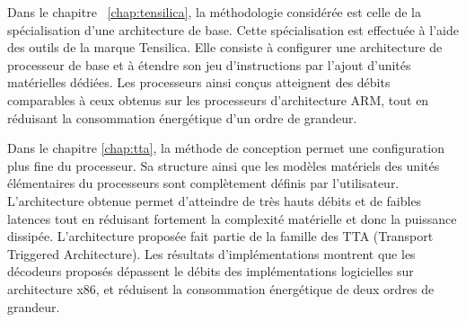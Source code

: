 Dans le chapitre ~\ref{chap:tensilica}, la méthodologie considérée est celle de la spécialisation d'une architecture de base. Cette spécialisation est effectuée à l'aide des outils de la marque Tensilica. Elle consiste à configurer une architecture de processeur de base et à étendre son jeu d'instructions par l'ajout d'unités matérielles dédiées. Les processeurs ainsi conçus atteignent des débits comparables à ceux obtenus sur les processeurs d'architecture ARM, tout en réduisant la consommation énergétique d'un ordre de grandeur. 

Dans le chapitre \ref{chap:tta}, la méthode de conception permet une configuration plus fine du processeur. Sa structure ainsi que les modèles matériels des unités élémentaires du processeurs sont complètement définis par l'utilisateur. L'architecture obtenue permet d'atteindre de très hauts débits et de faibles latences tout en réduisant fortement la complexité matérielle et donc la puissance dissipée. L'architecture proposée fait partie de la famille des TTA (Transport Triggered Architecture). Les résultats d'implémentations montrent que les décodeurs proposés dépassent le débits des implémentations logicielles sur architecture x86, et réduisent la consommation énergétique de deux ordres de grandeur.

\clearpage

